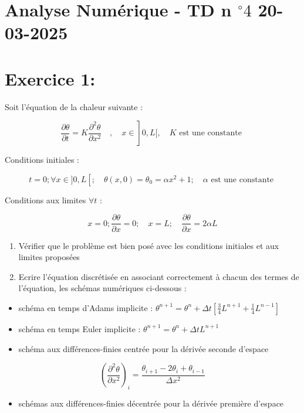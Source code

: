 \documentclass[10pt]{article}
\begin{document}
\section*{Analyse Numérique - TD n \({ }^{\circ} 4\) 20-03-2025}
\section*{Exercice 1:}
Soit l'équation de la chaleur suivante :

\[
\left.\frac{\partial \theta}{\partial t}=K \frac{\partial^{2} \theta}{\partial x^{2}} \quad, \quad x \in\right] 0, L[, \quad K \text { est une constante }
\]

Conditions initiales :

\[
t=0 ; \forall x \in] 0, L\left[; \quad \theta(x, 0)=\theta_{0}=\alpha x^{2}+1 ; \quad \alpha\right. \text { est une constante }
\]

Conditions aux limites \(\forall t\) :

\[
x=0 ; \frac{\partial \theta}{\partial x}=0 ; \quad x=L ; \quad \frac{\partial \theta}{\partial x}=2 \alpha L
\]

\begin{enumerate}
  \item Vérifier que le problème est bien posé avec les conditions initiales et aux limites proposées
  \item Ecrire l'équation discrétisée en associant correctement à chacun des termes de l'équation, les schémas numériques ci-dessous :
\end{enumerate}

\begin{itemize}
  \item schéma en temps d'Adams implicite : \(\theta^{n+1}=\theta^{n}+\Delta t\left[\frac{3}{4} L^{n+1}+\frac{1}{4} L^{n-1}\right]\)
  \item schéma en temps Euler implicite : \(\theta^{n+1}=\theta^{n}+\Delta t L^{n+1}\)
  \item schéma aux différences-finies centrée pour la dérivée seconde d'espace
\end{itemize}

\[
\left(\frac{\partial^{2} \theta}{\partial x^{2}}\right)_{i}=\frac{\theta_{i+1}-2 \theta_{i}+\theta_{i-1}}{\Delta x^{2}}
\]

\begin{itemize}
  \item schémas aux différences-finies décentrée pour la dérivée première d'espace
\end{itemize}
\end{document}
